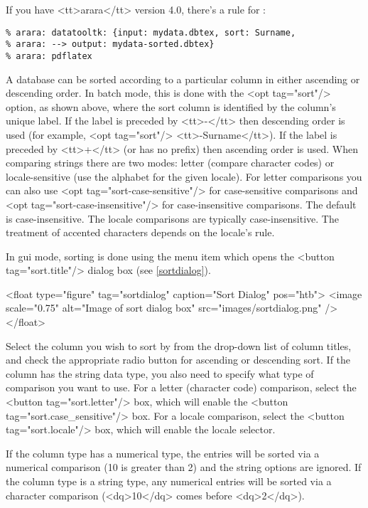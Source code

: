    If you have <tt>arara</tt> version 4.0, there's a rule for :

\begin{verbatim}
% arara: datatooltk: {input: mydata.dbtex, sort: Surname,
% arara: --> output: mydata-sorted.dbtex}
% arara: pdflatex
\end{verbatim}

   A database can be sorted according to a particular column
   in either ascending or descending order. In batch mode, this is done
   with the <opt tag="sort"/> option, as shown above, where the sort column is identified
   by the column's unique label. If the label is preceded by <tt>-</tt> then
   descending order is used (for example, <opt tag="sort"/> <tt>-Surname</tt>). If the label is preceded by <tt>+</tt> (or has
   no prefix) then ascending order is used. When comparing strings there are 
   two modes: letter (compare character codes) or locale-sensitive
   (use the alphabet for the given locale).
   For letter comparisons you 
   can also use <opt tag="sort-case-sensitive"/> for case-sensitive comparisons
   and <opt tag="sort-case-insensitive"/> for case-insensitive comparisons.
   The default is case-insensitive. The locale comparisons are
   typically case-insensitive. The treatment of accented characters depends
   on the locale's rule.

In \gls{gui} mode, sorting is
   done using the  menu item which opens
   the <button tag="sort.title"/> dialog box (see \autoref{sortdialog}).

   <float type="figure" tag="sortdialog" caption="Sort Dialog" pos="htb">
      <image scale="0.75" alt="Image of sort dialog box" src="images/sortdialog.png" />
   </float>

   Select the column you wish to sort by from the drop-down list of column
   titles, and check the appropriate radio button for ascending or descending
   sort. If the column has the string data type, you also need to specify
   what type of comparison you want to use. For a letter (character code)
   comparison, select the <button tag="sort.letter"/> box, which will enable
   the <button tag="sort.case_sensitive"/> box. For a locale comparison,
   select the <button tag="sort.locale"/> box, which will enable the
   locale selector.


   If the column type has a numerical type, the entries will be sorted via 
   a numerical comparison (10 is greater than 2) and the string
   options are ignored. If the column type is a string type,
   any numerical entries will be sorted via a character comparison (<dq>10</dq>
   comes before <dq>2</dq>).

